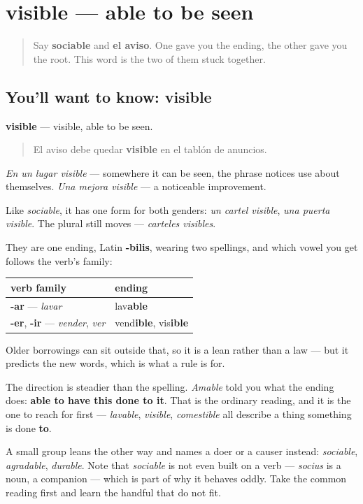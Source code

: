 \section[visible]{visible — able to be seen}

\label{lesson:ES-C466-visible}



\begin{quote}
Say \textbf{sociable} and \textbf{el aviso}. One gave you the ending, the other gave you the root. This word is the two of them stuck together.
\end{quote}

\subsection*{You'll want to know: visible}
\textbf{visible} — visible, able to be seen.

\begin{quote}
El aviso debe quedar \textbf{visible} en el tablón de anuncios.
\end{quote}

\emph{En un lugar visible} — somewhere it can be seen, the phrase notices use about themselves. \emph{Una mejora visible} — a noticeable improvement.

Like \emph{sociable}, it has one form for both genders: \emph{un cartel visible}, \emph{una puerta visible}. The plural still moves — \emph{carteles visibles}.

\begin{grammarlens}[title={Grammar Lens: -able and -ible point two ways}]
They are one ending, Latin \textbf{-bilis}, wearing two spellings, and which vowel you get follows the verb's family:

\noindent
\begin{tabularx}{\linewidth}{@{}>{\raggedright\arraybackslash}X>{\raggedright\arraybackslash}X@{}}
\toprule
\textbf{verb family} & \textbf{ending} \\
\midrule
\textbf{-ar} — \emph{lavar} & lav\textbf{able} \\
\textbf{-er}, \textbf{-ir} — \emph{vender}, \emph{ver} & vend\textbf{ible}, vis\textbf{ible} \\
\bottomrule
\end{tabularx}

Older borrowings can sit outside that, so it is a lean rather than a law — but it predicts the new words, which is what a rule is for.

The direction is steadier than the spelling. \emph{Amable} told you what the ending does: \textbf{able to have this done to it}. That is the ordinary reading, and it is the one to reach for first — \emph{lavable}, \emph{visible}, \emph{comestible} all describe a thing something is done \textbf{to}.

A small group leans the other way and names a doer or a causer instead: \emph{sociable}, \emph{agradable}, \emph{durable}. Note that \emph{sociable} is not even built on a verb — \emph{socius} is a noun, a companion — which is part of why it behaves oddly. Take the common reading first and learn the handful that do not fit.
\end{grammarlens}

